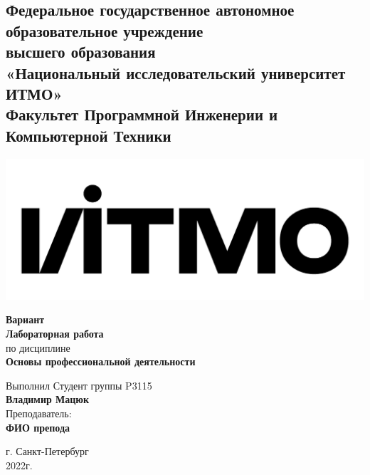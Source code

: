 \documentclass{article}
\begin{document}
\begin{center}
  \section*{
    Федеральное государственное автономное образовательное учреждение\\ высшего образования\\
    «Национальный исследовательский университет ИТМО»\\
    Факультет Программной Инженерии и Компьютерной Техники \\
   }
  \includegraphics[scale=0.2]{../../img/itmo.png}
\end{center}
\vspace{4cm}


\begin{center}
  \large \textbf{Вариант }\\
  \textbf{Лабораторная работа }\\
  по дисциплине\\
  \textbf{Основы профессиональной деятельности}
\end{center}

\vspace*{\fill}

\begin{flushright}
  Выполнил Студент группы P3115\\
  \textbf{Владимир Мацюк}\\
  Преподаватель: \\
  \textbf{ФИО препода}\\
\end{flushright}

\vspace{1cm}

\begin{center}
  г. Санкт-Петербург\\
  2022г.
\end{center}

\newpage
\end{document}
